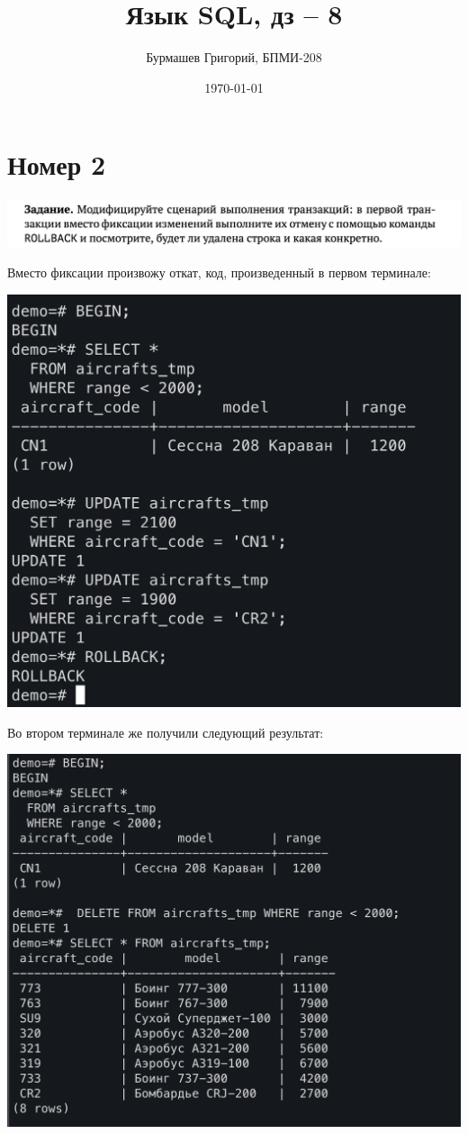 \documentclass[a4paper,12pt]{article}
\author{Бурмашев Григорий, БПМИ-208}
\title{Язык SQL, дз -- 8 }
\date{\today}
\begin{document}
\maketitle
\section*{Номер 2}
\begin{center}
\includegraphics[scale=0.4]{t2.png}
\end{center}
Вместо фиксации произвожу откат, код, произведенный в первом терминале:
\begin{center}
\includegraphics[scale=0.6]{21.png}
\end{center}
Во втором терминале же получили следующий результат:
\begin{center}
\includegraphics[scale=0.6]{22.png}
\end{center}
\end{document}
